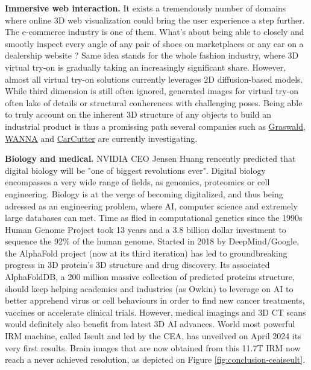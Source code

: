\noindent \textbf{Immersive web interaction.} It exists a tremendously number of domains where online 3D web visualization could bring the user experience a step further. The e-commerce industry is one of them. What's about being able to closely and smootly inspect every angle of any pair of shoes on  marketplaces or any car on a dealership website ? Same idea stands for the whole fashion industry, where 3D virtual try-on is gradually taking an increasingly significant share. However, almost all virtual try-on solutions currently leverages 2D diffusion-based models. While third dimension is still often ignored, generated images for virtual try-on often lake of details or structural conherences with challenging poses. Being able to truly account on the inherent 3D structure of any objects to build an industrial product is thus a promissing path several companies such as \href{https://www.graswald.ai/}{Graswald}, \href{https://wanna.fashion/}{WANNA} and \href{https://www.car-cutter.com/}{CarCutter} are currently investigating. 

\noindent \textbf{Biology and medical.} NVIDIA CEO Jensen Huang rencently predicted that digital biology will be "one of biggest revolutions ever". Digital biology encompasses a very wide range of fields, as genomics, proteomics or cell engineering. Biology is at the verge of becoming digitalized, and thus being adressed as an engineering problem, where \ac{AI}, computer science and extremely large databases can met. Time as flied in computational genetics since the 1990s Human Genome Project took 13 years and a 3.8 billion dollar investment to sequence the 92\% of the human genome. Started in 2018 by DeepMind/Google, the AlphaFold project (now at its third iteration) has led to groundbreaking progress in 3D protein's 3D structure and drug discovery. Its associated AlphaFoldDB, a 200 million massive collection of predicted proteins structure, should keep helping academics and industries (as Owkin) to leverage on \ac{AI} to better apprehend virus or cell behaviours in order to find new cancer treatments, vaccines or accelerate clinical trials. However, medical imagings and 3D CT scans would definitely also benefit from latest 3D \ac{AI} advances. World most powerful IRM machine, called Iseult and led by the CEA, has unveilved on April 2024 its very first results. Brain images that are now obtained from this 11.7T IRM now reach a never achieved resolution, as depicted on Figure \ref{fig:conclusion-ceaiseult}.

